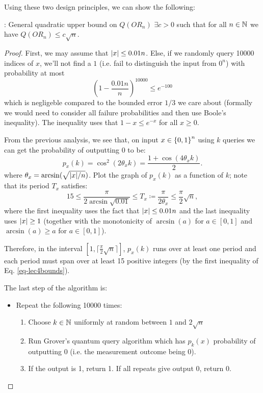 Using these two design principles, we can show the following:
\begin{propbox}{: General quadratic upper bound on $Q(OR_n)$}
    $\exists c > 0$ such that for all $n \in \mathbb{N}$ we have $Q(OR_n) \leq c\sqrt{n}$. 
\end{propbox}
\begin{proof}
    First, we may assume that $\lvert x \rvert \leq 0.01n$. Else, if we randomly query 10000 indices of $x$, we'll not find a $1$ (i.e. fail to distinguish the input from $0^n$) with probability at most
    \begin{equation}
        \left(1 - \frac{0.01n}{n}\right)^{10000} \leq e^{-100}
    \end{equation}
    which is negligeble compared to the bounded error $1/3$ we care about (formally we would need to consider all failure probabilities and then use Boole's inequality). The inequality uses that $1 - x \leq e^{-x}$ for all $x \geq 0$. 

    From the previous analysis, we see that, on input $x \in \set{0, 1}^n$ using $k$ queries we can get the probability of outputting $0$ to be:
    \begin{equation}
        p_x(k) = \cos^2(2\theta_xk) = \frac{1 + \cos(4\theta_x k)}{2}.
    \end{equation}
    where $\theta_x = \arcsin(\sqrt{\lvert x \rvert/n})$. Plot the graph of $p_x(k)$ as a function of $k$; note that its period $T_x$ satisfies:
    \begin{equation}\label{eq-lec4bounds}
        15 \leq \frac{\pi}{2\arcsin\sqrt{0.01}} \leq T_x \coloneqq \frac{\pi}{2\theta_x} \leq \frac{\pi}{2}\sqrt{n},
    \end{equation}
    where the first inequality uses the fact that $\lvert x \rvert \leq 0.01n$ and the last inequality uses $\lvert x \rvert \geq 1$ (together with the monotonicity of $\arcsin(a)$ for $a \in [0, 1]$ and $\arcsin(a) \geq a$ for $a \in [0, 1]$).

    Therefore, in the interval $[1, \lceil \frac{\pi}{2}\sqrt{n} \rceil]$, $p_x(k)$ runs over at least one period and each period must span over at least 15 positive integers (by the first inequality of Eq. \eqref{eq-lec4bounds}).

    The last step of the algorithm is:
    \begin{itemize}
        \item Repeat the following 10000 times:
        \begin{enumerate}
            \item Choose $k \in \mathbb{N}$ uniformly at random between $1$ and $2\sqrt{n}$
            \item Run Grover's quantum query algorithm which has $p_k(x)$ probability of outputting $0$ (i.e. the measurement outcome being 0).
            \item If the output is 1, return 1. If all repeats give output 0, return 0.
        \end{enumerate}
    \end{itemize}
    

\end{proof}
